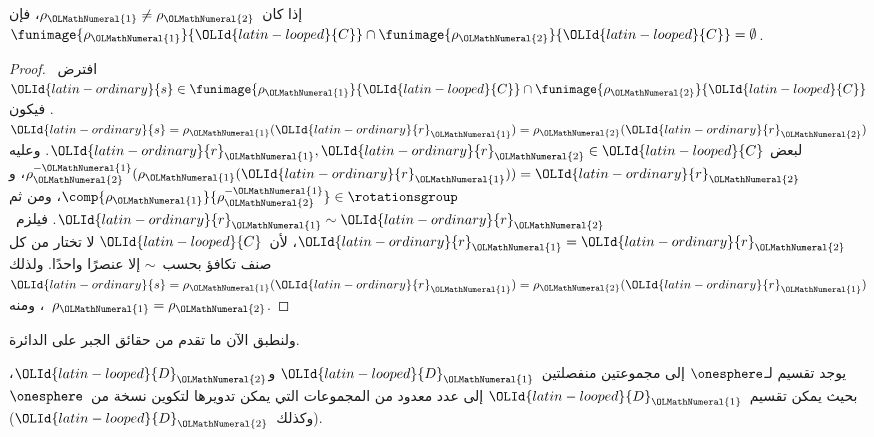 \documentclass[../../../include/open-logic-section]{subfiles}
\begin{document}
\begin{lem}
إذا كان~$\rho_{\OLMathNumeral{1}} \neq \rho_{\OLMathNumeral{2}}$، فإن
$\funimage{\rho_{\OLMathNumeral{1}}}{{\OLId{latin-looped}{C}}} \cap \funimage{\rho_{\OLMathNumeral{2}}}{{\OLId{latin-looped}{C}}} = \emptyset$.
\end{lem}

\begin{proof}
افترض~${\OLId{latin-ordinary}{s}} \in \funimage{\rho_{{\OLMathNumeral{1}}}}{{\OLId{latin-looped}{C}}} \cap
\funimage{\rho_{{\OLMathNumeral{2}}}}{{\OLId{latin-looped}{C}}}$. فيكون
${\OLId{latin-ordinary}{s}} = \rho_{{\OLMathNumeral{1}}}({\OLId{latin-ordinary}{r}}_{{\OLMathNumeral{1}}}) = \rho_{{\OLMathNumeral{2}}}({\OLId{latin-ordinary}{r}}_{{\OLMathNumeral{2}}})$ لبعض
${\OLId{latin-ordinary}{r}}_{{\OLMathNumeral{1}}}, {\OLId{latin-ordinary}{r}}_{{\OLMathNumeral{2}}} \in {\OLId{latin-looped}{C}}$. وعليه
$\rho^{-{\OLMathNumeral{1}}}_{\OLMathNumeral{2}}(\rho_{\OLMathNumeral{1}}({\OLId{latin-ordinary}{r}}_{\OLMathNumeral{1}})) = {\OLId{latin-ordinary}{r}}_{\OLMathNumeral{2}}$، و
$\comp{\rho_{\OLMathNumeral{1}}}{\rho^{-{\OLMathNumeral{1}}}_{\OLMathNumeral{2}}} \in \rotationsgroup$، ومن ثم
${\OLId{latin-ordinary}{r}}_{{\OLMathNumeral{1}}} \sim {\OLId{latin-ordinary}{r}}_{{\OLMathNumeral{2}}}$. فيلزم~${\OLId{latin-ordinary}{r}}_{\OLMathNumeral{1}} = {\OLId{latin-ordinary}{r}}_{\OLMathNumeral{2}}$، لأن~${\OLId{latin-looped}{C}}$ لا تختار من كل صنف
تكافؤ بحسب~$\sim$ إلا عنصرًا واحدًا. ولذلك
${\OLId{latin-ordinary}{s}} = \rho_{\OLMathNumeral{1}}({\OLId{latin-ordinary}{r}}_{\OLMathNumeral{1}}) = \rho_{\OLMathNumeral{2}}({\OLId{latin-ordinary}{r}}_{\OLMathNumeral{1}})$، ومنه~$\rho_{\OLMathNumeral{1}} = \rho_{\OLMathNumeral{2}}$.
\end{proof}

ولنطبق الآن ما تقدم من حقائق الجبر على الدائرة.

\begin{lem}
يوجد تقسيم لـ$\onesphere$ إلى مجموعتين منفصلتين~${\OLId{latin-looped}{D}}_{{\OLMathNumeral{1}}}$ و${\OLId{latin-looped}{D}}_{{\OLMathNumeral{2}}}$،
بحيث يمكن تقسيم~${\OLId{latin-looped}{D}}_{{\OLMathNumeral{1}}}$ إلى عدد معدود من المجموعات التي يمكن تدويرها
لتكوين نسخة من~$\onesphere$ (وكذلك~${\OLId{latin-looped}{D}}_{{\OLMathNumeral{2}}}$).
\end{lem}
\end{document}
